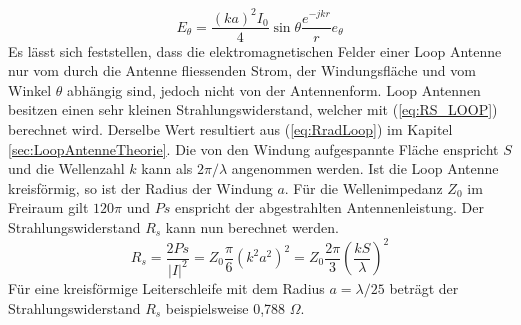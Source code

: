 \begin{equation}
E_{\theta}=\dfrac{(ka)^2I_{0}}{4}\sin \theta \dfrac{e^{-jkr}}{r} e_{\theta}
\end{equation}
Es lässt sich feststellen, dass die elektromagnetischen Felder einer Loop Antenne nur vom durch die Antenne fliessenden Strom, der Windungsfläche und vom Winkel $\theta$ abhängig sind, jedoch nicht von der Antennenform. Loop Antennen besitzen einen sehr kleinen Strahlungswiderstand, welcher mit (\ref{eq:RS_LOOP}) berechnet wird. Derselbe Wert resultiert aus (\ref{eq:RradLoop}) im Kapitel \ref{sec:LoopAntenneTheorie}. Die von den Windung aufgespannte Fläche enspricht $S$ und die Wellenzahl $k$ kann als $2\pi/\lambda$ angenommen werden. Ist die Loop Antenne kreisförmig, so ist der Radius der Windung $a$. Für die Wellenimpedanz $Z_0$ im Freiraum gilt $120\pi$ und $Ps$ enspricht der abgestrahlten Antennenleistung. Der Strahlungswiderstand $R_s$ kann nun berechnet werden.
\begin{equation}\label{eq:RS_LOOP}
R_{s}=\dfrac{2Ps}{|I|^{2}}=Z_{0}\dfrac{\pi}{6}(k^{2}a^{2})^{2}=Z_{0}\dfrac{2\pi}{3}\left(\dfrac{kS}{\lambda}\right)^{2} 
\end{equation}
Für eine kreisförmige Leiterschleife mit dem Radius $a = \lambda/25$ beträgt der Strahlungswiderstand $R_{s}$ beispielsweise  0,788 $\Omega$.


